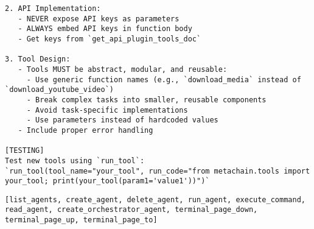 \begin{lstlisting}
2. API Implementation:
   - NEVER expose API keys as parameters
   - ALWAYS embed API keys in function body
   - Get keys from `get_api_plugin_tools_doc`

3. Tool Design:
   - Tools MUST be abstract, modular, and reusable:
     - Use generic function names (e.g., `download_media` instead of `download_youtube_video`)
     - Break complex tasks into smaller, reusable components
     - Avoid task-specific implementations
     - Use parameters instead of hardcoded values
   - Include proper error handling

[TESTING]
Test new tools using `run_tool`:
`run_tool(tool_name="your_tool", run_code="from metachain.tools import your_tool; print(your_tool(param1='value1'))")`

\end{lstlisting}



\begin{lstlisting}[basicstyle=\ttfamily\footnotesize, frame=none, columns=fullflexible, breaklines=true, breakatwhitespace=ture, breakindent=0pt, language=Tools, caption={Tools of \textbf{Agent Editor Agent}}, frame=shadowbox,xleftmargin=0.02\linewidth, xrightmargin=0.02\linewidth]
[list_agents, create_agent, delete_agent, run_agent, execute_command, read_agent, create_orchestrator_agent, terminal_page_down, terminal_page_up, terminal_page_to]
\end{lstlisting}

